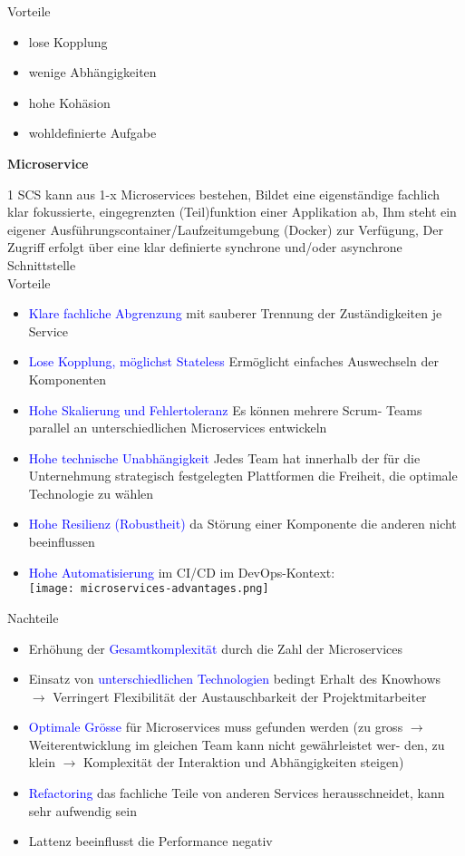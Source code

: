 Vorteile
\begin{itemize}
    \item lose Kopplung
    \item wenige Abhängigkeiten
    \item hohe Kohäsion
    \item wohldefinierte Aufgabe
\end{itemize}
\vspace{10pt}
\textbf{Microservice}

1 SCS kann aus 1-x Microservices bestehen, Bildet eine eigenständige fachlich klar fokussierte, eingegrenzten (Teil)funktion einer Applikation ab, Ihm steht ein eigener Ausführungscontainer/Laufzeitumgebung (Docker) zur Verfügung, Der Zugriff erfolgt über eine klar definierte synchrone und/oder asynchrone Schnittstelle \\

Vorteile
\begin{itemize}
    \item \textcolor{blue}{Klare fachliche Abgrenzung} mit sauberer Trennung der Zuständigkeiten je Service
    \item \textcolor{blue}{Lose Kopplung, möglichst Stateless} Ermöglicht einfaches Auswechseln der Komponenten
    \item \textcolor{blue}{Hohe Skalierung und Fehlertoleranz} Es können mehrere Scrum-
    Teams parallel an unterschiedlichen Microservices entwickeln
    \item \textcolor{blue}{Hohe technische Unabhängigkeit} Jedes Team hat innerhalb der für die Unternehmung strategisch festgelegten Plattformen die Freiheit, die optimale Technologie zu wählen
    \item \textcolor{blue}{Hohe Resilienz (Robustheit)} da Störung einer Komponente
    die anderen nicht beeinflussen
    \item \textcolor{blue}{Hohe Automatisierung} im CI/CD im DevOps-Kontext: \\ \texttt{[image: microservices-advantages.png]}
\end{itemize}
\vspace{10pt}
Nachteile

\begin{itemize}
    \item Erhöhung der \textcolor{blue}{Gesamtkomplexität} durch die Zahl der Microservices
    \item Einsatz von \textcolor{blue}{unterschiedlichen Technologien} bedingt Erhalt des Knowhows $\rightarrow$ Verringert Flexibilität der Austauschbarkeit der Projektmitarbeiter
    \item \textcolor{blue}{Optimale Grösse} für Microservices muss gefunden werden (zu gross $\rightarrow$ Weiterentwicklung im gleichen Team kann nicht gewährleistet wer-
    den, zu klein $\rightarrow$ Komplexität der Interaktion und Abhängigkeiten steigen)
    \item \textcolor{blue}{Refactoring} das fachliche Teile von anderen Services herausschneidet, kann sehr aufwendig sein
    \item Lattenz beeinflusst die Performance negativ
\end{itemize}

